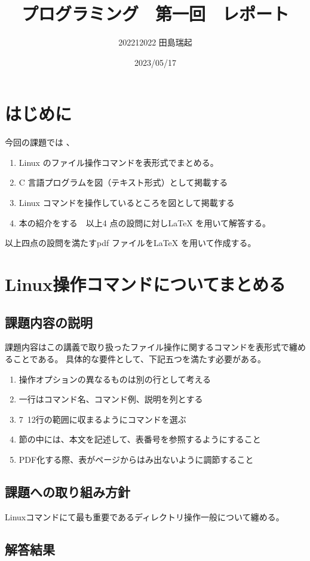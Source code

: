 \documentclass[fontsize = 14pt, paper= a4]{jlreq}
\begin{document}
\title{プログラミング　第一回　レポート}
\author{202212022 田島瑞起}
\date{2023/05/17}
\maketitle

\section{はじめに}
今回の課題では
、
\begin{enumerate}
\item Linux のファイル操作コマンドを表形式でまとめる。
\item C 言語プログラムを図（テキスト形式）として掲載する
\item Linux コマンドを操作しているところを図として掲載する
\item 本の紹介をする　以上4 点の設問に対しLaTeX を用いて解答する。
\end{enumerate}

以上四点の設問を満たすpdf ファイルをLaTeX を用いて作成する。

\section{Linux操作コマンドについてまとめる}
\subsection{課題内容の説明}
課題内容はこの講義で取り扱ったファイル操作に関するコマンドを表形式で纏めることである。
具体的な要件として、下記五つを満たす必要がある。
\begin{enumerate}
\item 操作オプションの異なるものは別の行として考える
\item 一行はコマンド名、コマンド例、説明を列とする
\item 7~12行の範囲に収まるようにコマンドを選ぶ
\item 節の中には、本文を記述して、表番号を参照するようにすること
\item PDF化する際、表がページからはみ出ないように調節すること
\end{enumerate}

\subsection{課題への取り組み方針}
Linuxコマンドにて最も重要であるディレクトリ操作一般について纏める。
\subsection{解答結果}
\end{document}

